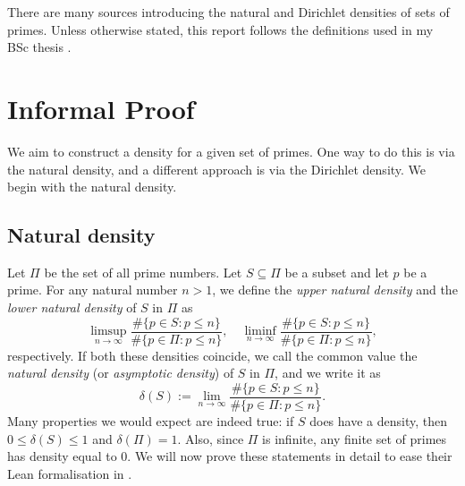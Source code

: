 \documentclass[a4paper,11pt]{article}
\theoremstyle{plain}
\begin{document}
	There are many sources introducing the natural and Dirichlet densities of sets of primes. Unless otherwise stated, this report follows the definitions used in my BSc thesis \cite{JAC_thesis}.

	\section{Informal Proof}\label{sec:informal}

    We aim to construct a density for a given set of primes. One way to do this is via the natural density, and a different approach is via the Dirichlet density. We begin with the natural density.

    \subsection{Natural density}
    
    Let $\Pi$ be the set of all prime numbers. Let $S\subseteq\Pi$ be a subset and let $p$ be a prime. For any natural number $n>1$, we define the \emph{upper natural density} and the \emph{lower natural density} of $S$ in $\Pi$ as
    	\begin{equation}
        \label{eq:up_low_nat_dens}
    		\limsup_{n\rightarrow\infty}\frac{\#\{p\in S: p \leq n\}}{\#\{p\in \Pi: p \leq n\}}, \quad \liminf_{n\rightarrow\infty}\frac{\#\{p\in S: p \leq n\}}{\#\{p\in \Pi: p \leq n\}},
    	\end{equation}
    	respectively. If both these densities coincide, we call the common value the \emph{natural density} (or \emph{asymptotic density}) of $S$ in $\Pi$, and we write it as
    	\begin{equation}
        \label{eq:natdens}
    		\delta(S):=\lim_{n\rightarrow\infty}\frac{\#\{p\in S: p \leq n\}}{\#\{p\in \Pi: p \leq n\}}.
    	\end{equation}
    Many properties we would expect are indeed true: if $S$ does have a density, then $0\leq \delta(S)\leq 1$ and $\delta(\Pi)=1$. Also, since $\Pi$ is infinite, any finite set of primes has density equal to $0$. We will now prove these statements in detail to ease their Lean formalisation in .
\end{document}

